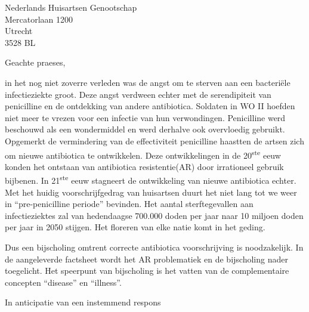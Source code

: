 \documentclass[foldmarks=true,foldmarks=blmtP,fromphone,
fromemail,fromlogo,version=last]{scrlttr2}
\begin{document}
\begin{letter}{%
	Nederlands Huisartsen Genootschap\\
	Mercatorlaan 1200\\
	Utrecht\\
	3528 BL%
}
\opening{Geachte praeses,}
in het nog niet zoverre verleden was de angst om te sterven aan een bacteri\"{e}le infectieziekte groot. Deze angst verdween echter met de serendipiteit van penicilline en de ontdekking van andere antibiotica. Soldaten in WO II hoefden niet meer te vrezen voor een infectie van hun verwondingen. Penicilline werd beschouwd als een wondermiddel en werd derhalve ook overvloedig gebruikt. Opgemerkt de vermindering van de effectiviteit penicilline haastten de artsen zich om nieuwe antibiotica te ontwikkelen. Deze ontwikkelingen in de 20\textsuperscript{ste} eeuw konden het ontstaan van antibiotica resistentie(AR) door irrationeel gebruik bijbenen. In 21\textsuperscript{ste} eeuw stagneert de ontwikkeling van nieuwe antibiotica echter. Met het huidig voorschrijfgedrag van huisartsen duurt het niet lang tot we weer in ``pre-penicilline periode'' bevinden. Het aantal sterftegevallen aan infectieziektes zal van hedendaagse 700.000 doden per jaar naar 10 miljoen doden per jaar in 2050 stijgen. Het floreren van elke natie komt in het geding.

Dus een bijscholing omtrent correcte antibiotica voorschrijving is noodzakelijk. In de aangeleverde factsheet wordt het AR problematiek en de bijscholing nader toegelicht. Het speerpunt van bijscholing is het vatten van de complementaire concepten ``disease'' en ``illness''. 

\closing{In anticipatie van een instemmend respons}
\end{letter}
\end{document}

